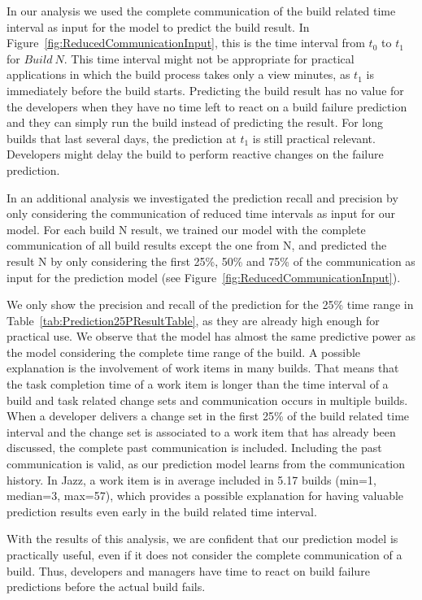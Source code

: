 In our analysis we used the complete communication of the build related time
interval as input for the model to predict the build result. In
Figure~\ref{fig:ReducedCommunicationInput}, this is the time interval from $t_0$
to $t_1$ for $Build~N$. This time interval might not be appropriate for practical
applications in which the build process takes only a view minutes, as $t_1$ is
immediately before the build starts. Predicting the build result has no value for
the developers when they have no time left to react on a build failure prediction
and they can simply run the build instead of predicting the result. For long
builds that last several days, the prediction at $t_1$ is still practical
relevant. Developers might delay the build to perform reactive changes on the
failure prediction.

In an additional analysis we investigated the prediction recall and precision by
only considering the communication of reduced time intervals as input for our
model. For each build N result, we trained our model with the complete
communication of all build results except the one from N, and predicted the
result N by only considering the first 25\%, 50\% and 75\% of the communication
as input for the prediction model (see
Figure~\ref{fig:ReducedCommunicationInput}).

We only show the precision and recall of the prediction for the 25\% time range
in Table~\ref{tab:Prediction25PResultTable}, as they are already high enough for
practical use. We observe that the model has almost the same predictive power as
the model considering the complete time range of the build. A possible
explanation is the involvement of work items in many builds. That means that the
task completion time of a work item is longer than the time interval of a build
and task related change sets and communication occurs in multiple builds. When a
developer delivers a change set in the first 25\% of the build related time
interval and the change set is associated to a work item that has already been
discussed, the complete past communication is included. Including the past
communication is valid, as our prediction model learns from the communication
history. In Jazz, a work item is in average included in 5.17 builds (min=1,
median=3, max=57), which provides a possible explanation for having valuable
prediction results even early in the build related time interval.

With the results of this analysis, we are confident that our prediction model is
practically useful, even if it does not consider the complete communication of a
build. Thus, developers and managers have time to react on build failure
predictions before the actual build fails.




